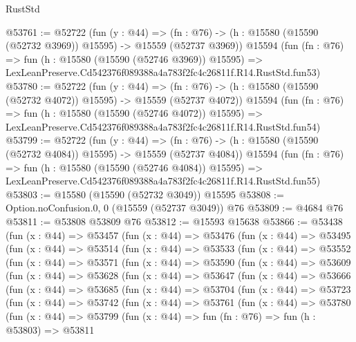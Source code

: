 \begin{lexlean}{RustStd}
\begin{coremodule}
@53761 := @52722
    (fun (y : @44) =>
    (fn : @76) -> (h : @15580 (@15590 (@52732 @3969)) @15595) -> @15559 (@52737 @3969))
    @15594
    (fun (fn : @76) =>
    fun (h : @15580 (@15590 (@52746 @3969)) @15595) =>
    LexLeanPreserve.Cd542376f089388a4a783f2fc4c26811f.R14.RustStd.fun53)
@53780 := @52722
    (fun (y : @44) =>
    (fn : @76) -> (h : @15580 (@15590 (@52732 @4072)) @15595) -> @15559 (@52737 @4072))
    @15594
    (fun (fn : @76) =>
    fun (h : @15580 (@15590 (@52746 @4072)) @15595) =>
    LexLeanPreserve.Cd542376f089388a4a783f2fc4c26811f.R14.RustStd.fun54)
@53799 := @52722
    (fun (y : @44) =>
    (fn : @76) -> (h : @15580 (@15590 (@52732 @4084)) @15595) -> @15559 (@52737 @4084))
    @15594
    (fun (fn : @76) =>
    fun (h : @15580 (@15590 (@52746 @4084)) @15595) =>
    LexLeanPreserve.Cd542376f089388a4a783f2fc4c26811f.R14.RustStd.fun55)
@53803 := @15580 (@15590 (@52732 @3049)) @15595
@53808 := Option.noConfusion.{0, 0} (@15559 (@52737 @3049)) @76
@53809 := @4684 @76
@53811 := @53808 @53809 @76
@53812 := @15593 @15638
@53866 := @53438
    (fun (x : @44) =>
    @53457
      (fun (x : @44) =>
      @53476
        (fun (x : @44) =>
        @53495
          (fun (x : @44) =>
          @53514
            (fun (x : @44) =>
            @53533
              (fun (x : @44) =>
              @53552
                (fun (x : @44) =>
                @53571
                  (fun (x : @44) =>
                  @53590
                    (fun (x : @44) =>
                    @53609
                      (fun (x : @44) =>
                      @53628
                        (fun (x : @44) =>
                        @53647
                          (fun (x : @44) =>
                          @53666
                            (fun (x : @44) =>
                            @53685
                              (fun (x : @44) =>
                              @53704
                                (fun (x : @44) =>
                                @53723
                                  (fun (x : @44) =>
                                  @53742
                                    (fun (x : @44) =>
                                    @53761
                                      (fun (x : @44) =>
                                      @53780
                                        (fun (x : @44) =>
                                        @53799
                                          (fun (x : @44) =>
                                          fun (fn : @76) =>
                                          fun (h : @53803) =>
                                          @53811

\end{coremodule}
\end{lexlean}
